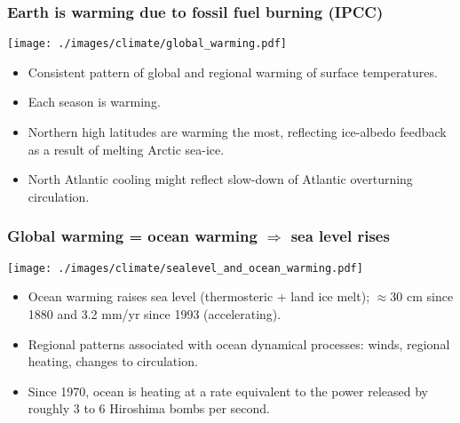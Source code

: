 \documentclass[10pt]{beamer}
\begin{document}
\begin{frame}
  \frametitle{Earth is warming due to fossil fuel burning (IPCC)}

\begin{center}
\vspace{-.25cm}
{\texttt{[image: ./images/climate/global\_warming.pdf]}}
\vspace{-.75cm}
\end{center}

\begin{exampleblock}{}
\begin{itemize}
\item Consistent pattern of global and regional warming of surface temperatures. 
\item Each season is warming.
\item Northern high latitudes are warming the most, reflecting
  ice-albedo feedback as a result of melting Arctic sea-ice.
\item North Atlantic cooling might reflect slow-down of Atlantic
  overturning circulation.
\end{itemize}
\end{exampleblock}{}

\end{frame}


\begin{frame}
  \frametitle{Global warming = ocean warming $\Rightarrow$ sea level rises}

\begin{center}
\vspace{-.25cm}
{\texttt{[image: ./images/climate/sealevel\_and\_ocean\_warming.pdf]}}
\vspace{-0.5cm}
\end{center}

\vspace{-.3cm} 
\begin{exampleblock}{}
\begin{itemize}
\item Ocean warming raises sea level (thermosteric + land ice melt);
  $\approx 30$ cm since 1880 and 3.2 mm/yr since 1993 (accelerating).
\item Regional patterns associated with ocean dynamical processes:
  winds, regional heating, changes to circulation.
\item Since 1970, ocean is heating at a rate equivalent to the power
  released by roughly 3 to 6 Hiroshima bombs per second.
\end{itemize}
\end{exampleblock}{}

\end{frame}
\end{document}
